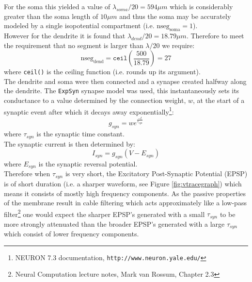 \documentclass[paper=a4, fontsize=11pt]{scrartcl} %
\numberwithin{equation}{section} %
\numberwithin{figure}{section} %
\numberwithin{table}{section} %
\begin{document}
For the soma this yielded a value of $\lambda_{soma}/20 = 594 \mu m$  which is considerably greater than the soma length of $10\mu m$ and thus the soma may be accurately modeled by a single isopotential compartment (i.e. $\textrm{nseg}_{\textrm{soma}}=1$).\\

However for the dendrite it is found that $\lambda_{dend}/20=18.79\mu m$. Therefore to meet the requirement that no segment is larger than $\lambda / 20$ we require:
\begin{equation}
\textrm{nseg}_{\textrm{dend}} = \texttt{ceil}\left( \frac{500}{18.79} \right ) = 27
\end{equation}
where \texttt{ceil()} is the ceiling function (i.e. rounds up its argument).\\

The dendrite and soma were then connected and a synapse created halfway along the dendrite. The \texttt{ExpSyn} synapse model was used, this instantaneously sets its conductance to a value determined by the connection weight, $w$, at the start of a synaptic event after which it decays away exponentially\footnote{ \label{neurondoc} NEURON 7.3 documentation, \texttt{http://www.neuron.yale.edu/}}:
\begin{equation}
g_{syn}= w e^{\frac{-t}{\tau_{syn}}}
\label{eq:gsyn}
\end{equation} 
where $\tau_{syn}$ is the synaptic time constant.\\

The synaptic current is then determined by:
\begin{equation}
I_{syn} = g_{syn}(V - E_{syn}) 
\label{eq:Isyn}
\end{equation}
where $E_{syn}$ is the synaptic reversal potential.\\

Therefore when $\tau_{syn}$ is very short, the Excitatory Post-Synaptic Potential (EPSP) is of short duration (i.e. a sharper waveform, see Figure \ref{fig:vtracegraph}) which means it consists of mostly high frequency components. As the passive properties of the membrane result in cable filtering which acts approximately like a low-pass filter\footnote{Neural Computation lecture notes, Mark van Rossum, Chapter 2.3} one would expect the sharper EPSP's generated with a small $\tau_{syn}$ to be more strongly attenuated than the broader EPSP's generated with a large $\tau_{syn}$ which consist of lower frequency components.\\
\end{document}
